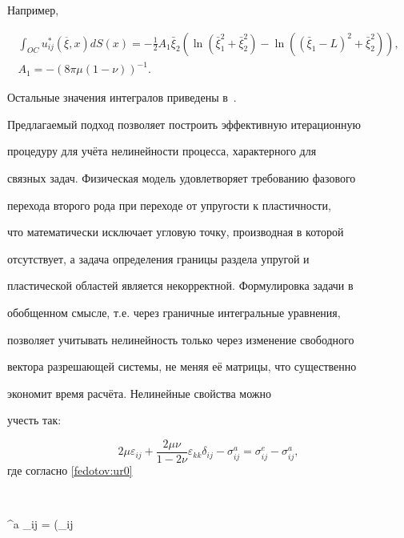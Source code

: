 Например,

\begin{gather*}

\int  _{OC}u_{ij}^* (\overline{\xi},x) dS(x) =-\frac{1}{2}

A_1 \bar{\xi}_2 \left(\ln \left(\bar{\xi}_1^2 +\bar{\xi }_2^2

\right)-\ln \left((\bar{\xi }_1 -L)^2 +\bar{\xi }_2^2

\right)\right),\\

A_1 =-({8 \pi \mu (1-\nu )})^{-1}.

\end{gather*}

Остальные значения интегралов приведены в~\cite{fed:bib:Fed2}.



Предлагаемый подход позволяет построить эффективную итерационную

процедуру для учёта нелинейности процесса, характерного для

связных задач. Физическая модель удовлетворяет требованию фазового

перехода второго рода при переходе от упругости к пластичности,

что математически исключает угловую точку, производная в которой

отсутствует, а задача определения границы раздела упругой и

пластической областей является некорректной. Формулировка задачи в

обобщенном смысле, т.е. через граничные интегральные уравнения,

позволяет учитывать нелинейность только через изменение свободного

вектора разрешающей системы, не меняя её матрицы, что существенно

экономит время расчёта. Нелинейные свойства можно

учесть так:

$$

2\mu \varepsilon _{ij} +\frac{2\mu \nu }{1-2\nu } \varepsilon

_{kk} \delta _{ij} -\sigma _{ij}^a =\sigma _{ij}^e -\sigma

_{ij}^a, $$ где согласно \eqref{fedotov:ur0}

$$

\sigma ^a _{ij} = \Bigl(\varepsilon _{ij}

